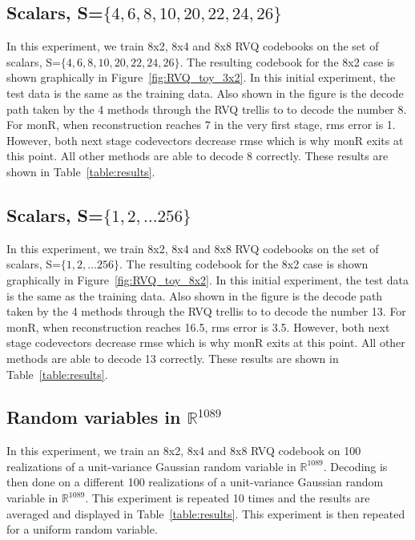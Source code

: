 \subsection{Scalars, S=$\{4, 6, 8, 10, 20, 22, 24, 26\}$}
In this experiment, we train 8x2, 8x4 and 8x8 RVQ codebooks on the set of scalars, S=$\{4, 6, 8, 10, 20, 22, 24, 26\}$.  The resulting codebook for the 8x2 case is shown graphically in Figure~\ref{fig:RVQ_toy_3x2}.  In this initial experiment, the test data is the same as the training data.  Also shown in the figure is the decode path taken by the 4 methods through the RVQ trellis to to decode the number 8.  For monR, when reconstruction reaches 7 in the very first stage, rms error is 1.  However, both next stage codevectors decrease rmse which is why monR exits at this point.  All other methods are able to decode 8 correctly.  These results are shown in Table~\ref{table:results}.  
  
 
\subsection{Scalars, S=$\{1, 2, \ldots 256\}$}
In this experiment, we train 8x2, 8x4 and 8x8 RVQ codebooks on the set of scalars, S=$\{1, 2, \ldots 256\}$.  The resulting codebook for the 8x2 case is shown graphically in Figure~\ref{fig:RVQ_toy_8x2}.  In this initial experiment, the test data is the same as the training data.  Also shown in the figure is the decode path taken by the 4 methods through the RVQ trellis to to decode the number 13.  For monR, when reconstruction reaches 16.5, rms error is 3.5.  However, both next stage codevectors decrease rmse which is why monR exits at this point.  All other methods are able to decode 13 correctly.   These results are shown in Table~\ref{table:results}. 

\subsection{Random variables in $\mathbb{R}^{1089}$}
In this experiment, we train an 8x2, 8x4 and 8x8 RVQ codebook on 100 realizations of a unit-variance Gaussian random variable in $\mathbb{R}^{1089}$.  Decoding is then done on a different 100 realizations of a unit-variance Gaussian random variable in $\mathbb{R}^{1089}$.  This experiment is repeated 10 times and the results are averaged and displayed in Table~\ref{table:results}.  This experiment is then repeated for a uniform random variable.

